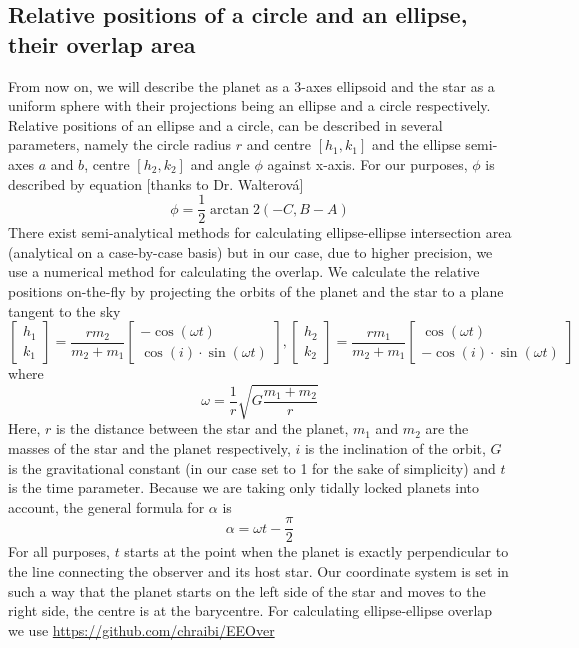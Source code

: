 \documentclass[10pt]{article}
\numberwithin{equation}{subsection}
\begin{document}
\subsection{Relative positions of a circle and an ellipse, their overlap area}
From now on, we will describe the planet as a 3-axes ellipsoid and the star as a uniform
sphere with their projections being an ellipse and a circle respectively.
Relative positions of an ellipse and a circle, can be described
in several parameters, namely the circle radius $r$ and centre $[h_1, k_1]$ and the
ellipse semi-axes $a$ and $b$, centre $[h_2, k_2]$ and angle $\phi$ against x-axis. For
our purposes, $\phi$ is described by equation \cite{correia1} [thanks to Dr. Walterová]
\begin{equation}
  \phi = \frac{1}{2}\arctan 2(-C, B-A)
  \label{eq:phi}
\end{equation}
There exist semi-analytical methods for calculating ellipse-ellipse intersection area
(analytical on a case-by-case basis) \cite{eeover} but in our case, due to higher
precision, we use a numerical method for calculating the overlap.
We calculate the relative positions on-the-fly by projecting the orbits of the planet
and the star to a plane tangent to the sky
\begin{equation}
  \begin{bmatrix}
    h_1 \\
    k_1 
  \end{bmatrix}
  = \frac{rm_2}{m_2+m_1}
  \begin{bmatrix}
    -\cos(\omega t) \\
    \cos(i)\cdot\sin(\omega t)
  \end{bmatrix},
  \begin{bmatrix}
    h_2 \\
    k_2 
  \end{bmatrix}
  = \frac{rm_1}{m_2+m_1}
  \begin{bmatrix}
    \cos(\omega t) \\
    -\cos(i)\cdot\sin(\omega t)
  \end{bmatrix}
  \label{eq:projected-orbit}
\end{equation}
where
\begin{equation}
  \omega = \frac{1}{r}\sqrt{G\frac{m_1 + m_2}{r}}
  \label{eq:omega}
\end{equation}
Here, $r$ is the distance between the star and the planet, $m_1$ and $m_2$ are the masses
of the star and the planet respectively, $i$ is the inclination of the orbit, $G$ is the
gravitational constant (in our case set to 1 for the sake of simplicity) and $t$ is the
time parameter. Because we are taking only tidally locked planets into account,
the general formula for $\alpha$ is
\begin{equation}
  \alpha = \omega t - \frac{\pi}{2}
  \label{eq:alpha_omega}
\end{equation}
For all purposes, $t$ starts at the point when the planet is exactly perpendicular to
the line connecting the observer and its host star. Our coordinate system is set in such
a way that the planet starts on the left side of the star and moves to the right side,
the centre is at the barycentre.
For calculating ellipse-ellipse overlap we use \url{https://github.com/chraibi/EEOver}
\end{document}
